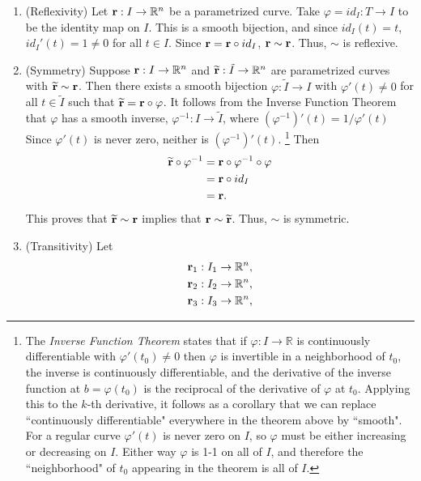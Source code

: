\documentclass[12pt,letterpaper,reqno]{article}
\numberwithin{equation}{section}
\newcommand{\R}{\ensuremath{\mathbb R}}
\newcommand{\bbr}{{\bf r}}
\begin{document}
{\begin{pf}
	\begin{enumerate}[(1)]
		\item (Reflexivity) Let $\bbr:I \to \R^n$ be a parametrized curve. Take $\varphi=id_I:T \to I$ to be the identity map on $I$. This is a smooth bijection, and since $id_I(t)=t$, $id_I'(t)=1 \neq 0$ for all $t \in I$. Since $\bbr=\bbr \circ id_I$, $\bbr \sim \bbr$. Thus, $\sim$ is reflexive.
		\item (Symmetry) Suppose $\bbr:I \to \R^n$ and $\widetilde{\bbr}:\tilde{I} \to \R^n$ are parametrized curves with $\widetilde{\bbr} \sim \bbr$. Then there exists a smooth bijection $\varphi: \tilde{I} \to I$ with $\varphi'(t) \neq 0$ for all $t \in \tilde{I}$ such that $\widetilde{\bbr}=\bbr \circ \varphi$. It follows from the Inverse Function Theorem that $\varphi$ has a smooth inverse, $\varphi^{-1} :I \to \tilde{I}$, where $(\varphi^{-1})'(t)=1/\varphi'(t)$ Since $\varphi'(t)$ is never zero, neither is $(\varphi^{-1})'(t)$. \footnote{The \emph{Inverse Function Theorem} states that if $\varphi:I \to \R$ is continuously differentiable with $\varphi'(t_0) \neq 0$ then $\varphi$ is invertible in a neighborhood of $t_0$, the inverse is continuously differentiable, and the derivative of the inverse function at $b=\varphi(t_0)$ is the reciprocal of the derivative of $\varphi$ at $t_0$. Applying this to the $k$-th derivative, it follows as a corollary that we can replace ``continuously differentiable" everywhere in the theorem above by ``smooth". For a regular curve $\varphi'(t)$ is never zero on $I$, so $\varphi$ must be either increasing or decreasing on $I$. Either way $\varphi$ is 1-1 on all of $I$, and therefore the ``neighborhood" of $t_0$ appearing in the theorem is all of $I$.} Then 
		\begin{align*}
			\widetilde{\bbr} \circ \varphi^{-1}&=\bbr \circ \varphi^{-1} \circ \varphi \\
			&=\bbr \circ id_I \\
			&=\bbr. 
		\end{align*}
		 This proves that $\widetilde{\bbr} \sim \bbr$ implies that $\bbr \sim \widetilde{\bbr}$. Thus, $\sim$ is symmetric.
		\item (Transitivity) Let
		\begin{align*}
			\bbr_1:I_1 &\to \R^n, \\
			\bbr_2:I_2 &\to \R^n, \\
			\bbr_3:I_3 &\to \R^n, \\
		\end{align*}

\end{enumerate}
\end{pf}}
\end{document}
